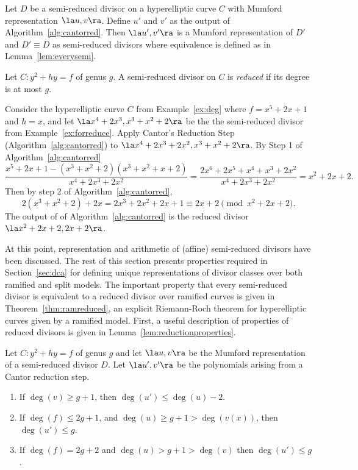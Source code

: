 \bl
\cite[Adapted from Lemma~10.3.17]{Galbraith_PKC_2012} Let $D$ be a semi-reduced
divisor on a hyperelliptic curve $C$ with Mumford representation $\la u,v \ra$.
Define $u'$ and $v'$ as the output of Algorithm~\ref{alg:cantorred}.
Then $\la u',v' \ra$ is a Mumford representation of $D'$ and $D' \equiv D$ as
semi-reduced divisors where equivalence is defined as in
Lemma~\ref{lem:everysemi}.
\el

\bd\label{def:reduced}
\cite[Adapted from Definition~10.3.22]{Galbraith_PKC_2012} Let $C : y^2 + hy =
f$ of genus $g$. A semi-reduced divisor on $C$ is \emph{reduced} if its
degree is at most $g$.
\ed

\be\label{ex:reduce}
Consider the hyperelliptic curve $C$ from Example~\ref{ex:dcg} where $f = x^5 +
2x + 1$ and $h =x$, and let $\la x^4 + 2x^3, x^3 + x^2 + 2 \ra$ be the the
semi-reduced divisor from Example~\ref{ex:forreduce}. Apply Cantor's Reduction Step
(Algorithm~\ref{alg:cantorred}) to $\la x^4 + 2x^3 + 2x^2, x^3 + x^2 + 2 \ra$. By
Step 1 of Algorithm~\ref{alg:cantorred} $$ \frac{x^5 + 2x + 1  - (x^3 + x^2 +
2)(x^3 + x^2 + x + 2)}{x^4 + 2x^3 + 2x^2} = \frac{2x^6 + 2x^5 + x^4 + x^3 +
2x^2}{x^4 + 2x^3 + 2x^2} = x^2 + 2x + 2.$$ Then by step 2 of
Algorithm~\ref{alg:cantorred}, $$2(x^3 + x^2 + 2) + 2x = 2x^3 + 2x^2 + 2x + 1
\equiv 2x + 2 \pmod{x^2 + 2x + 2}.$$ The output of of
Algorithm~\ref{alg:cantorred} is the reduced divisor $\la x^2 + 2x + 2, 2x + 2 \ra$.
\ee

At this point, representation and arithmetic of (affine) semi-reduced divisors
have been discussed. The rest of this section presents properties required in
Section~\ref{sec:dca} for defining unique representations of divisor classes
over both ramified and split models. The important property that every
semi-reduced divisor is equivalent to a reduced divisor over ramified curves is
given in Theorem~\ref{thm:ramreduced}, an explicit Riemann-Roch theorem for
hyperelliptic curves given by a ramified model. First, a useful description of
properties of reduced divisors is given in Lemma~\ref{lem:reductionproperties}.

\bl\label{lem:reductionproperties}
\cite[Adapted from Lemma~10.3.20]{Galbraith_PKC_2012} Let $C : y^2 + hy =
f$ of genus $g$ and let $\la u,v \ra$ be the Mumford representation of a
semi-reduced divisor $D$. Let $\la u',v' \ra$ be the polynomials arising from a
Cantor reduction step. \begin{enumerate}
  \item If $\deg(v) \geq g+1$, then $\deg(u') \leq \deg(u) - 2$.
  \item If $\deg(f) \leq 2g + 1$, and $\deg(u) \geq g+1 > \deg(v(x))$,
  then $\deg(u') \leq g$.
  \item If $\deg(f) = 2g + 2$ and $\deg(u) > g+ 1 > \deg(v)$ then
  $\deg(u') \leq g$.
\end{enumerate}
\el

